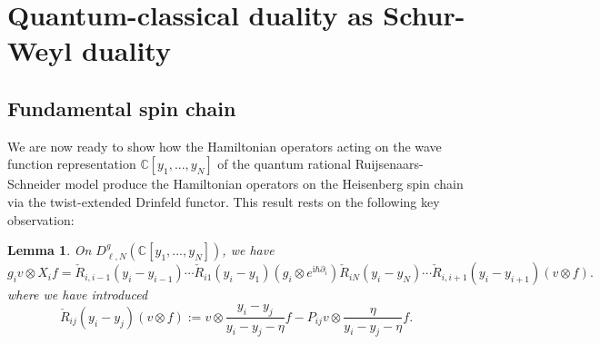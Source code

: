 \documentclass[11pt]{report}
\newtheorem{lemma}[theorem]{Lemma}
\theoremstyle{definition}
\theoremstyle{remark}
\theoremstyle{remark}
\newcommand{\C}{\mathbb{C}}
\newcommand{\I}{\mathrm{i}}
\begin{document}
\section{Quantum-classical duality as Schur-Weyl duality}

\subsection{Fundamental spin chain}

We are now ready to show how the Hamiltonian operators acting on the wave function representation $\C[y_1,...,y_N]$ of the quantum rational Ruijsenaars-Schneider model produce the Hamiltonian operators on the Heisenberg spin chain via the twist-extended Drinfeld functor. This result rests on the following key observation:

\begin{lemma}\label{lemma:keyLemma}
On $D_{\ell,N}^g(\C[y_1,...,y_N])$, we have
\begin{equation*}
g_i v \otimes X_i f = \check R_{i,i-1}(y_i-y_{i-1}) \cdots \check R_{i1}(y_i-y_1) (g_i \otimes e^{\I \hbar \partial_i}) \check R_{iN}(y_i-y_N) \cdots \check R_{i,i+1}(y_i-y_{i+1}) (v \otimes f).
\end{equation*}
where we have introduced
\begin{equation*}
\check R_{ij}(y_i-y_j) (v \otimes f) := v \otimes \frac{y_i-y_j}{y_i-y_j-\eta} f - P_{ij} v \otimes \frac{\eta}{y_i-y_j-\eta} f.
\end{equation*}
\end{lemma}
\end{document}
